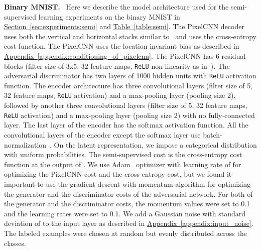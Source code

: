 \documentclass{article}
\newcommand{\mysec}[1]{\hyperref[sec:#1]{Section~\ref*{sec:#1}}}
\newcommand{\mytable}[1]{\hyperref[table:#1]{Table~\ref*{table:#1}}}
\newcommand{\myappendix}[1]{\hyperref[appendix:#1]{Appendix~\ref*{appendix:#1}}}
\DeclareRobustCommand{\parhead}[1]{\textbf{#1}~}
\begin{document}
\begin{appendices}
\parhead{Binary MNIST.} Here we describe the model architecture used for the semi-supervised learning experiments on the binary MNIST in \mysec{experiments:semi} and \mytable{semi}. 
The PixelCNN decoder uses both the vertical and horizontal stacks similar to~\citep{pixelcnn} and uses the cross-entropy cost function.
The PixelCNN uses the location-invariant bias as described in \myappendix{conditioning_of_pixelcnn}.
The PixelCNN has 6 residual blocks (filter size of 3x5, 32 feature maps, \texttt{ReLU} non-linearity as in~\citep{pixelcnn}). 
The adversarial discriminator has two layers of 1000 hidden units with \texttt{ReLU} activation function. 
The encoder architecture has three convolutional layers (filter size of 5, 32 feature maps, \texttt{ReLU} activation) and a max-pooling layer (pooling size 2), followed by another three convolutional layers (filter size of 5, 32 feature maps, \texttt{ReLU} activation) and a max-pooling layer (pooling size 2) with no fully-connected layer.
The last layer of the encoder  has the softmax activation function. All the convolutional layers of the encoder except the softmax layer use batch-normalization~\citep{batch}. 
On the latent representation, we impose a categorical distribution with uniform probabilities. 
The semi-supervised cost is the cross-entropy cost function at the output of . We use Adam~\citep{Adam} optimizer with learning rate of  for optimizing the PixelCNN cost and the cross-entropy cost, but we found it important to use the gradient descent with momentum algorithm for optimizing the generator and the discriminator costs of the adversarial network. 
For both of the generator and the discriminator costs, the momentum values were set to 0.1 and the learning rates were set to 0.1. 
We add a Gaussian noise with standard deviation of  to the input layer as described in \myappendix{input_noise}. 
The labeled examples were chosen at random but evenly distributed across the classes.


\end{appendices}
\end{document}

